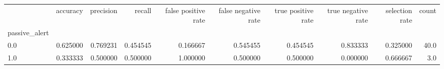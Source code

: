 \begin{tabular}{lrrrrrrrrr}
\toprule
{} &  accuracy &  precision &    recall &  false positive rate &  false negative rate &  true positive rate &  true negative rate &  selection rate &  count \\
passive\_alert &           &            &           &                      &                      &                     &                     &                 &        \\
\midrule
0.0           &  0.625000 &   0.769231 &  0.454545 &             0.166667 &             0.545455 &            0.454545 &            0.833333 &        0.325000 &   40.0 \\
1.0           &  0.333333 &   0.500000 &  0.500000 &             1.000000 &             0.500000 &            0.500000 &            0.000000 &        0.666667 &    3.0 \\
\bottomrule
\end{tabular}
